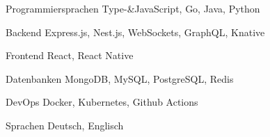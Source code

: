 

\begin{cvskills}

  \cvskill
    {Programmiersprachen} %
    {Type-\&JavaScript, Go, Java, Python} %

  \cvskill
    {Backend} %
    {Express.js, Nest.js, WebSockets, GraphQL, Knative} %

  \cvskill
    {Frontend} %
    {React, React Native} %

  \cvskill
    {Datenbanken} %
    {MongoDB, MySQL, PostgreSQL, Redis} %

  \cvskill
    {DevOps} %
    {Docker, Kubernetes, Github Actions} %

  \cvskill
    {Sprachen} %
    {Deutsch, Englisch} %

\end{cvskills}
